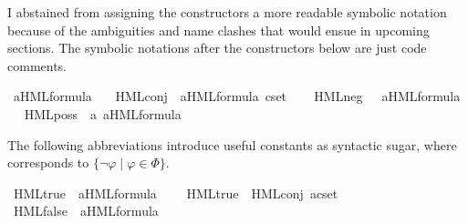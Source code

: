 \begin{isabellebody}
\begin{isamarkuptext}
I abstained from assigning the constructors a more readable symbolic notation because of the ambiguities and name clashes that would ensue in upcoming sections. The symbolic notations after the constructors below are just code comments.
\pagebreak%
\end{isamarkuptext}\isamarkuptrue%
\isamarkupfalse%
\ {\isacharparenleft}{\kern0pt}{\isacharprime}{\kern0pt}a{\isacharparenright}{\kern0pt}HML{\isacharunderscore}{\kern0pt}formula\ {\isacharequal}{\kern0pt}\isanewline
\ \ HML{\isacharunderscore}{\kern0pt}conj\ \ {\isacartoucheopen}{\isacharparenleft}{\kern0pt}{\isacharprime}{\kern0pt}a{\isacharparenright}{\kern0pt}HML{\isacharunderscore}{\kern0pt}formula\ cset{\isacartoucheclose}\ %
\isamarkupcmt{$\bigwedge \Phi$%
}\ \isanewline
{\isacharbar}{\kern0pt}\ HML{\isacharunderscore}{\kern0pt}neg\ \ \ {\isacartoucheopen}{\isacharparenleft}{\kern0pt}{\isacharprime}{\kern0pt}a{\isacharparenright}{\kern0pt}HML{\isacharunderscore}{\kern0pt}formula{\isacartoucheclose}\ %
\isamarkupcmt{$\neg\varphi$%
}\ \isanewline
{\isacharbar}{\kern0pt}\ HML{\isacharunderscore}{\kern0pt}poss\ \ {\isacartoucheopen}{\isacharprime}{\kern0pt}a{\isacartoucheclose}\ {\isacartoucheopen}{\isacharparenleft}{\kern0pt}{\isacharprime}{\kern0pt}a{\isacharparenright}{\kern0pt}HML{\isacharunderscore}{\kern0pt}formula{\isacartoucheclose}\ %
\isamarkupcmt{$\langle\alpha\rangle\varphi$%
}%
\begin{isamarkuptext}%
The following abbreviations introduce useful constants as syntactic sugar, where  corresponds to $\{ \neg\varphi \mid \varphi\in\Phi \}$.%
\end{isamarkuptext}\isamarkuptrue%
\isamarkupfalse%
\ HML{\isacharunderscore}{\kern0pt}true\ {\isacharcolon}{\kern0pt}{\isacharcolon}{\kern0pt}\ {\isacartoucheopen}{\isacharparenleft}{\kern0pt}{\isacharprime}{\kern0pt}a{\isacharparenright}{\kern0pt}HML{\isacharunderscore}{\kern0pt}formula{\isacartoucheclose}\ %
\isanewline
\ \ \ {\isacartoucheopen}HML{\isacharunderscore}{\kern0pt}true\ {\isasymequiv}\ HML{\isacharunderscore}{\kern0pt}conj\ {\isacharparenleft}{\kern0pt}acset\ {\isasymemptyset}{\isacharparenright}{\kern0pt}{\isacartoucheclose}\isanewline
{}\isamarkupfalse%
\ HML{\isacharunderscore}{\kern0pt}false\ {\isacharcolon}{\kern0pt}{\isacharcolon}{\kern0pt}\ {\isacartoucheopen}{\isacharparenleft}{\kern0pt}{\isacharprime}{\kern0pt}a{\isacharparenright}{\kern0pt}HML{\isacharunderscore}{\kern0pt}formula{\isacartoucheclose}\ %

\end{isabellebody}
